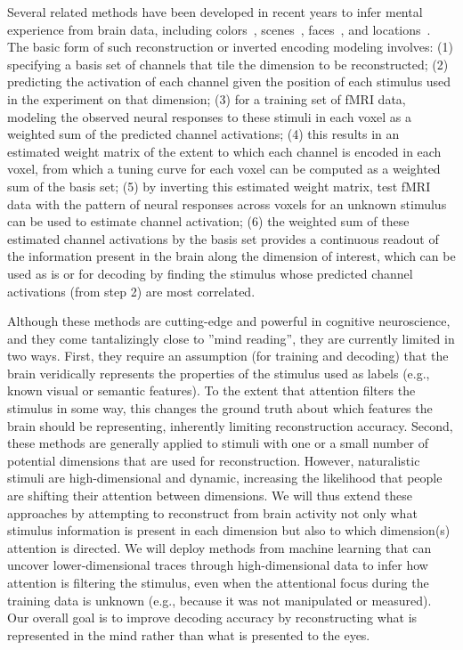Several related methods have been developed in recent years to infer
mental experience from brain data, including
colors~\citep{Brouwer:2009}, scenes~\citep{Naselaris:2009},
faces~\citep{Cowen:2014}, and locations~\citep{Sprague:2016}. The
basic form of such reconstruction or inverted encoding modeling
involves: (1) specifying a basis set of channels that tile the
dimension to be reconstructed; (2) predicting the activation of each
channel given the position of each stimulus used in the experiment on
that dimension; (3) for a training set of fMRI data, modeling the
observed neural responses to these stimuli in each voxel as a weighted
sum of the predicted channel activations; (4) this results in an
estimated weight matrix of the extent to which each channel is encoded
in each voxel, from which a tuning curve for each voxel can be
computed as a weighted sum of the basis set; (5) by inverting this
estimated weight matrix, test fMRI data with the pattern of neural
responses across voxels for an unknown stimulus can be used to
estimate channel activation; (6) the weighted sum of these estimated
channel activations by the basis set provides a continuous readout of
the information present in the brain along the dimension of interest,
which can be used as is or for decoding by finding the stimulus whose
predicted channel activations (from step 2) are most correlated.

Although these methods are cutting-edge and powerful in cognitive
neuroscience, and they come tantalizingly close to ''mind reading'',
they are currently limited in two ways. First, they require an
assumption (for training and decoding) that the brain veridically
represents the properties of the stimulus used as labels (e.g., known
visual or semantic features). To the extent that attention filters the
stimulus in some way, this changes the ground truth about which
features the brain should be representing, inherently limiting
reconstruction accuracy. Second, these methods are generally applied
to stimuli with one or a small number of potential dimensions that are
used for reconstruction. However, naturalistic stimuli are
high-dimensional and dynamic, increasing the likelihood that people
are shifting their attention between dimensions. We will thus extend
these approaches by attempting to reconstruct from brain activity not
only what stimulus information is present in each dimension but also
to which dimension(s) attention is directed. We will deploy methods
from machine learning that can uncover lower-dimensional traces
through high-dimensional data to infer how attention is filtering the
stimulus, even when the attentional focus during the training data is
unknown (e.g., because it was not manipulated or measured). Our
overall goal is to improve decoding accuracy by reconstructing what is
represented in the mind rather than what is presented to the eyes.


